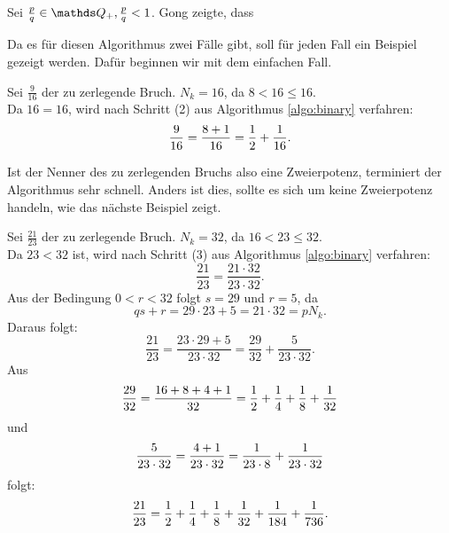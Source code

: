 Sei $\frac{p}{q} \in \Q_+, \frac{p}{q} < 1$. Gong zeigte, dass 

Da es für diesen Algorithmus zwei Fälle gibt, soll für jeden Fall ein Beispiel gezeigt werden. Dafür beginnen wir mit dem einfachen Fall.

\begin{bsp}
	Sei $\frac{9}{16}$ der zu zerlegende Bruch. $N_k = 16$, da $8<16\leq16$.\\
	Da $16 = 16$, wird nach Schritt (2) aus Algorithmus \ref{algo:binary} verfahren:
	$$\frac{9}{16} = \frac{8+1}{16} = \frac{1}{2}+\frac{1}{16}.$$
\end{bsp}
Ist der Nenner des zu zerlegenden Bruchs also eine Zweierpotenz, terminiert der Algorithmus sehr schnell. Anders ist dies, sollte es sich um keine Zweierpotenz handeln, wie das nächste Beispiel zeigt.
\begin{bsp}
	Sei $\frac{21}{23}$ der zu zerlegende Bruch. $N_k = 32$, da $16 < 23 \leq 32$.\\
	Da $23<32$ ist, wird nach Schritt (3) aus Algorithmus \ref{algo:binary} verfahren:
	$$\frac{21}{23} = \frac{21 \cdot 32}{23 \cdot 32}.$$
	Aus der Bedingung $0<r<32$ folgt $s = 29$ und $r = 5$, da $$qs+r = 29 \cdot 23 + 5 = 21 \cdot 32 = p N_k.$$
	Daraus folgt:
	$$\frac{21}{23} = \frac{23 \cdot 29+5}{23 \cdot 32} = \frac{29}{32} + \frac{5}{23 \cdot 32}.$$
	Aus $$\frac{29}{32} = \frac{16+8+4+1}{32} = \frac{1}{2} + \frac{1}{4} + \frac{1}{8} + \frac{1}{32}$$ und $$\frac{5}{23 \cdot 32} = \frac{4+1}{23 \cdot 32} = \frac{1}{23 \cdot 8} + \frac{1}{23 \cdot 32}$$ folgt:
	$$\frac{21}{23} = \frac{1}{2} + \frac{1}{4} + \frac{1}{8} + \frac{1}{32} + \frac{1}{184} + \frac{1}{736}.$$
\end{bsp}